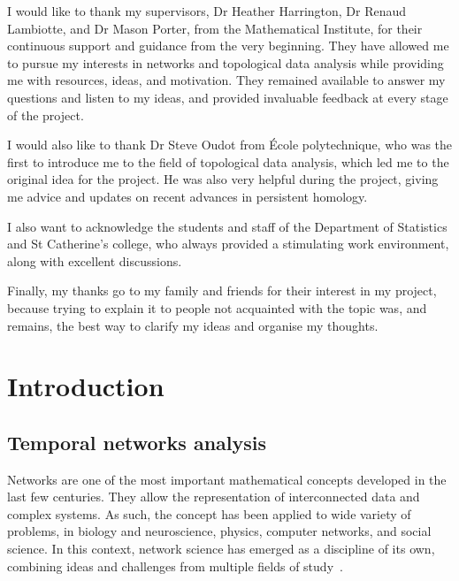 \documentclass[a4paper,11pt,openany,extrafontsizes]{memoir}
\begin{document}
I would like to thank my supervisors, Dr Heather Harrington, Dr Renaud
Lambiotte, and Dr Mason Porter, from the Mathematical Institute, for
their continuous support and guidance from the very beginning. They
have allowed me to pursue my interests in networks and topological
data analysis while providing me with resources, ideas, and
motivation. They remained available to answer my questions and listen
to my ideas, and provided invaluable feedback at every stage of the
project.

I would also like to thank Dr Steve Oudot from École polytechnique,
who was the first to introduce me to the field of topological data
analysis, which led me to the original idea for the project. He was
also very helpful during the project, giving me advice and updates on
recent advances in persistent homology.

I also want to acknowledge the students and staff of the Department of
Statistics and St Catherine's college, who always provided a
stimulating work environment, along with excellent discussions.

Finally, my thanks go to my family and friends for their interest in
my project, because trying to explain it to people not acquainted with
the topic was, and remains, the best way to clarify my ideas and
organise my thoughts.

\cleardoublepage%

\tableofcontents

\clearpage

\listoffigures

\begingroup
\let\clearpage\relax
\listofalgorithms%
\endgroup

\clearpage

\mainmatter%

\chapter{Introduction}%
\label{cha:introduction}

\section{Temporal networks analysis}%
\label{sec:temp-netw-analys}

Networks are one of the most important mathematical concepts developed
in the last few centuries. They allow the representation of
interconnected data and complex systems. As such, the concept has been
applied to wide variety of problems, in biology and neuroscience,
physics, computer networks, and social science. In this context,
network science has emerged as a discipline of its own, combining
ideas and challenges from multiple fields of
study~\cite{newman_networks:_2010}.
\end{document}
